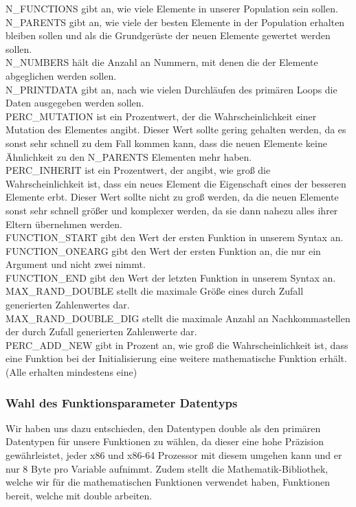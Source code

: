 \documentclass[a4paper,12pt]{article}
\begin{document}
\noindent N\_FUNCTIONS gibt an, wie viele Elemente in unserer Population sein sollen.\\
N\_PARENTS gibt an, wie viele der besten Elemente in der Population erhalten bleiben sollen und als die Grundgerüste der neuen Elemente gewertet werden sollen.\\
N\_NUMBERS hält die Anzahl an Nummern, mit denen die der Elemente abgeglichen werden sollen. \\
N\_PRINTDATA gibt an, nach wie vielen Durchläufen des primären Loops die Daten ausgegeben werden sollen. \\
PERC\_MUTATION ist ein Prozentwert, der die Wahrscheinlichkeit einer Mutation des Elementes angibt. Dieser Wert sollte gering gehalten werden, da es sonst sehr schnell zu dem Fall kommen kann, dass die neuen Elemente keine Ähnlichkeit zu den N\_PARENTS Elementen mehr haben. \\
PERC\_INHERIT ist ein Prozentwert, der angibt, wie groß die Wahrscheinlichkeit ist, dass ein neues Element die Eigenschaft eines der besseren Elemente erbt. Dieser Wert sollte nicht zu groß werden, da die neuen Elemente sonst sehr schnell größer und komplexer werden, da sie dann nahezu alles ihrer Eltern übernehmen werden. \\
FUNCTION\_START gibt den Wert der ersten Funktion in unserem Syntax an.\\
FUNCTION\_ONEARG gibt den Wert der ersten Funktion an, die nur ein Argument und nicht zwei nimmt. \\
FUNCTION\_END gibt den Wert der letzten Funktion in unserem Syntax an.\\
MAX\_RAND\_DOUBLE stellt die maximale Größe eines durch Zufall generierten Zahlenwertes dar.\\
MAX\_RAND\_DOUBLE\_DIG stellt die maximale Anzahl an Nachkommastellen der durch Zufall generierten Zahlenwerte dar. \\
PERC\_ADD\_NEW gibt in Prozent an, wie groß die Wahrscheinlichkeit ist, dass eine Funktion bei der Initialisierung eine weitere mathematische Funktion erhält. (Alle erhalten mindestens eine)\\

\subsubsection{Wahl des Funktionsparameter Datentyps}
Wir haben uns dazu entschieden, den Datentypen double als den primären Datentypen für unsere Funktionen zu wählen, da dieser eine hohe Präzision gewährleistet, jeder x86 und x86-64 Prozessor mit diesem umgehen kann und er nur 8 Byte pro Variable aufnimmt. Zudem stellt die Mathematik-Bibliothek, welche wir für die mathematischen Funktionen verwendet haben, Funktionen bereit, welche mit double arbeiten. 
\end{document}
